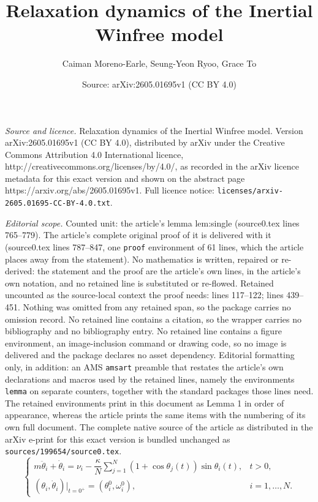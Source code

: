 \documentclass[10pt,a4paper]{amsart}
\title{Relaxation dynamics of the Inertial Winfree model}
\author{Caiman Moreno-Earle, Seung-Yeon Ryoo, Grace To}
\date{Source: arXiv:2605.01695v1 (CC BY 4.0)}
\begin{document}
\maketitle

\noindent\emph{Source and licence.} Relaxation dynamics of the Inertial Winfree model. Version arXiv:2605.01695v1 (CC BY 4.0), distributed by arXiv under the Creative Commons Attribution 4.0 International licence, http://creativecommons.org/licenses/by/4.0/, as recorded in the arXiv licence metadata for this exact version and shown on the abstract page https://arxiv.org/abs/2605.01695v1. Full licence notice: \texttt{licenses/arxiv-2605.01695-CC-BY-4.0.txt}.\par\smallskip

\noindent\textit{Editorial scope.} Counted unit: the article's lemma lem:single (source0.tex lines 765--779). The article's complete original proof of it is delivered with it (source0.tex lines 787--847, one \texttt{proof} environment of 61 lines, which the article places away from the statement). No mathematics is written, repaired or re-derived: the statement and the proof are the article's own lines, in the article's own notation, and no retained line is substituted or re-flowed.  Retained uncounted as the source-local context the proof needs: lines 117--122; lines 439--451.  Nothing was omitted from any retained span, so the package carries no omission record.  No retained line contains a citation, so the wrapper carries no bibliography and no bibliography entry.  No retained line contains a figure environment, an image-inclusion command or drawing code, so no image is delivered and the package declares no asset dependency.  Editorial formatting only, in addition: an AMS \texttt{amsart} preamble that restates the article's own declarations and macros used by the retained lines, namely the environments \texttt{lemma} on separate counters, together with the standard packages those lines need.  The retained environments print in this document as Lemma 1 in order of appearance, whereas the article prints the same items with the numbering of its own full document.  The complete native source of the article as distributed in the arXiv e-print for this exact version is bundled unchanged as \texttt{sources/199654/source0.tex}.
\begin{equation}\label{Winfree}
    \begin{cases}
        m\ddot\theta_i + \dot{\theta}_i=\nu_i-\dfrac\kappa N \sum_{j=1}^N (1+\cos\theta_j(t))\sin\theta_i(t), & t>0, \\[2pt]
        (\theta_i,\dot\theta_i)\big\rvert_{t=0^+} =(\theta_i^0,\omega_i^0), & i=1,\dots,N.
    \end{cases}
\end{equation}
\end{document}
